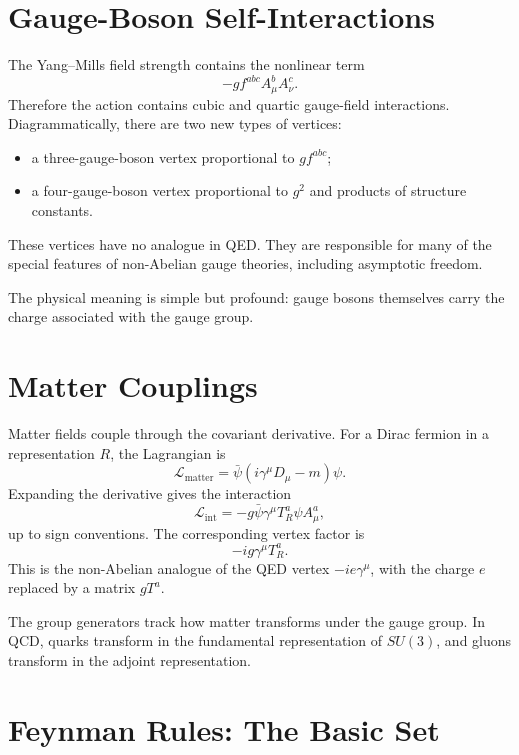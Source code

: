 \section{Gauge-Boson Self-Interactions}

The Yang--Mills field strength contains the nonlinear term
\[
    -g f^{abc}A_\mu^bA_\nu^c.
\]
Therefore the action contains cubic and quartic gauge-field interactions.
Diagrammatically, there are two new types of vertices:
\begin{itemize}
    \item a three-gauge-boson vertex proportional to \(g f^{abc}\);
    \item a four-gauge-boson vertex proportional to \(g^2\) and products of
    structure constants.
\end{itemize}
These vertices have no analogue in QED. They are responsible for many of the
special features of non-Abelian gauge theories, including asymptotic freedom.

The physical meaning is simple but profound: gauge bosons themselves carry the
charge associated with the gauge group.

\section{Matter Couplings}

Matter fields couple through the covariant derivative. For a Dirac fermion in a
representation \(R\), the Lagrangian is
\[
    \mathcal{L}_{\mathrm{matter}}
    = \bar\psi(i\gamma^\mu D_\mu-m)\psi.
\]
Expanding the derivative gives the interaction
\[
    \mathcal{L}_{\mathrm{int}}
    = -g\bar\psi\gamma^\mu T_R^a\psi A_\mu^a,
\]
up to sign conventions. The corresponding vertex factor is
\[
    -ig\gamma^\mu T_R^a.
\]
This is the non-Abelian analogue of the QED vertex \(-ie\gamma^\mu\), with the
charge \(e\) replaced by a matrix \(gT^a\).

The group generators track how matter transforms under the gauge group. In QCD,
quarks transform in the fundamental representation of \(SU(3)\), and gluons
transform in the adjoint representation.

\section{Feynman Rules: The Basic Set}

